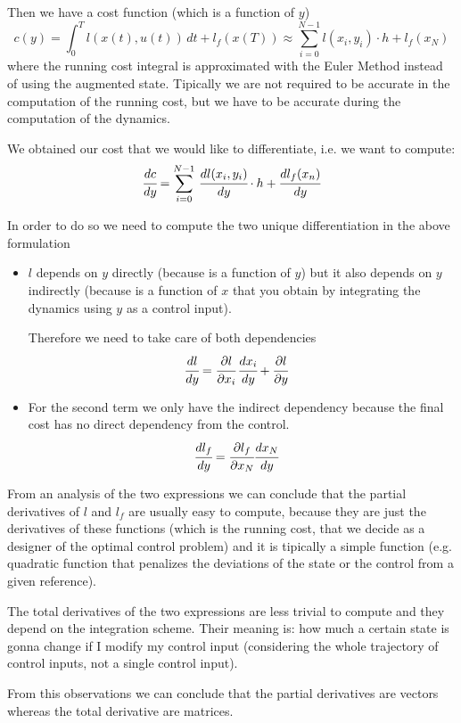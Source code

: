 Then we have a cost function (which is a function of $y$)
\[c(y) = \int_0^T l(x(t), u(t))\,dt + l_f(x(T))  \approx \sum_{i=0}^{N-1} l(x_i, y_i)\cdot h + l_f(x_N)\]
where the running cost integral is approximated with the Euler Method instead of using the augmented state. Tipically we are not required to be accurate in the computation of the running cost, but we have to be accurate during the computation of the dynamics.

We obtained our cost that we would like to differentiate, i.e. we want to compute:
\[
\cfrac{dc}{dy} =  \sum_{i=0}^{N-1}\,\cfrac{dl(x_i, y_i)}{dy}\cdot h + \cfrac{dl_f(x_n)}{dy}
\]

In order to do so we need to compute the two unique differentiation in the above formulation
\begin{itemize}
\item $l$ depends on $y$ directly (because is a function of $y$) but it also depends on $y$ indirectly (because is a function of $x$ that you obtain by integrating the dynamics using $y$ as a control input).

Therefore we need to take care of both dependencies
\begin{align*}
\cfrac{dl}{dy} &= \cfrac{\partial l}{\partial x_i}\,\cfrac{dx_i}{dy}  + \cfrac{\partial l}{\partial y}
\end{align*}
\item For the second term we only have the indirect dependency because the final cost has no direct dependency from the control.
\begin{align*}
\cfrac{dl_f}{dy} &= \cfrac{\partial l_f}{\partial x_N} \cfrac{dx_N}{dy}
\end{align*}
\end{itemize}
From an analysis of the two expressions we can conclude that the partial derivatives of $l$ and $l_f$ are usually easy to compute, because they are just the derivatives of these functions (which is the running cost, that we decide as a designer of the optimal control problem) and it is tipically a simple function (e.g. quadratic function that penalizes the deviations of the state or the control from a given reference).

The total derivatives of the two expressions are less trivial to compute and they depend on the integration scheme. Their meaning is: how much a certain state is gonna change if I modify my control input (considering the whole trajectory of control inputs, not a single control input).

From this observations we can conclude that the partial derivatives are vectors whereas the total derivative are matrices.

